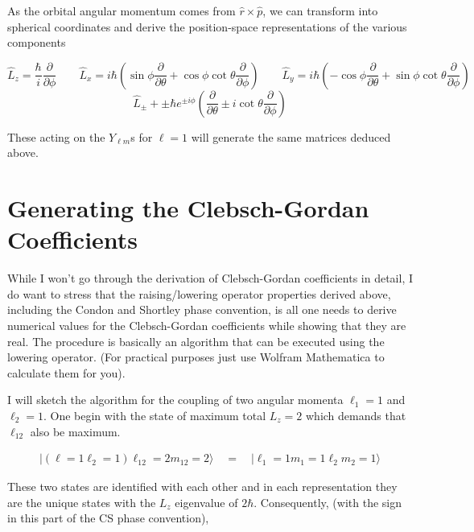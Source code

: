 \begin{itemize}
    As the orbital angular momentum comes from $\hat{r} \times \hat{p}$, we can
    transform into spherical coordinates and derive the position-space
    representations of the various components

    \[ \hat{L}_z = \frac{\hbar}{i} \frac{\partial }{\partial \phi} \qquad
      \hat{L}_x = i\hbar \left( \sin \phi \frac{\partial }{\partial \theta}
      + \cos \phi \cot \theta \frac{\partial }{\partial \phi}  \right) \qquad
      \hat{L}_y = i\hbar \left( -\cos\phi \frac{\partial }{\partial \theta}
    + \sin\phi \cot \theta \frac{\partial }{\partial \phi}  \right) \] 
    \[
      \hat{L}_\pm + \pm \hbar e^{\pm i\phi} \left( \frac{\partial }{\partial
      \theta} \pm i \cot \theta \frac{\partial }{\partial \phi}  \right)  
    \] \vspace{3px}
    
    These acting on the $Y_{\ell m}$s for $\ell = 1$ will generate the same
    matrices deduced above. 
\end{itemize}

\section{Generating the Clebsch-Gordan Coefficients}

While I won't go through the derivation of Clebsch-Gordan coefficients in
detail, I do want to stress that the raising/lowering operator properties
derived above, including the Condon and Shortley phase convention, is all one
needs to derive numerical values for the Clebsch-Gordan coefficients while
showing that they are real. The procedure is basically an algorithm that can be
executed using the lowering operator. (For practical purposes just use Wolfram
Mathematica to calculate them for you). 

I will sketch the algorithm for the coupling of two angular momenta $\ell_1
= 1$ and $\ell_2 = 1$. One begin with the state of maximum total $L_z = 2$
which demands that $\ell_{12}$ also be maximum. 

\begin{align}\label{cg_1}
|(\ell = 1 \ell_2 = 1) \ell_{12} = 2 m_{12} = 2 \rangle \quad = \quad |\ell_1
= 1 m_1 = 1 \ell_2 m_2 = 1 \rangle 
\end{align} \vspace{3px}


These two states are identified with each other  and in each representation
they are the unique states with the $L_z$ eigenvalue of $2\hbar$. Consequently,
(with the sign in this part of the CS phase convention), 

